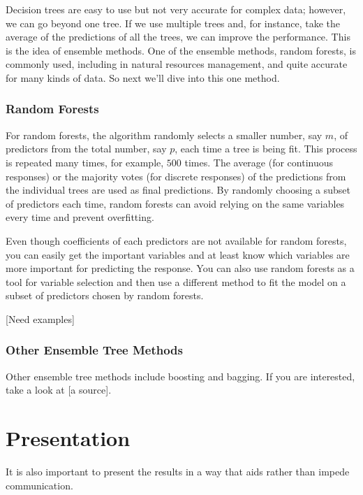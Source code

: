 \documentclass[
]{book}
\begin{document}
Decision trees are easy to use but not very accurate for complex data; however, we can go beyond one tree. If we use multiple trees and, for instance, take the average of the predictions of all the trees, we can improve the performance. This is the idea of ensemble methods. One of the ensemble methods, random forests, is commonly used, including in natural resources management, and quite accurate for many kinds of data. So next we'll dive into this one method.

\hypertarget{random-forests}{%
\subsection{Random Forests}\label{random-forests}}

For random forests, the algorithm randomly selects a smaller number, say \(m\), of predictors from the total number, say \(p\), each time a tree is being fit. This process is repeated many times, for example, \(500\) times. The average (for continuous responses) or the majority votes (for discrete responses) of the predictions from the individual trees are used as final predictions. By randomly choosing a subset of predictors each time, random forests can avoid relying on the same variables every time and prevent overfitting.

Even though coefficients of each predictors are not available for random forests, you can easily get the important variables and at least know which variables are more important for predicting the response. You can also use random forests as a tool for variable selection and then use a different method to fit the model on a subset of predictors chosen by random forests.

{[}Need examples{]}

\hypertarget{other-ensemble-tree-methods}{%
\subsection{Other Ensemble Tree Methods}\label{other-ensemble-tree-methods}}

Other ensemble tree methods include boosting and bagging. If you are interested, take a look at {[}a source{]}.

\hypertarget{presentation}{%
\chapter{Presentation}\label{presentation}}

It is also important to present the results in a way that aids rather than impede communication.
\end{document}
